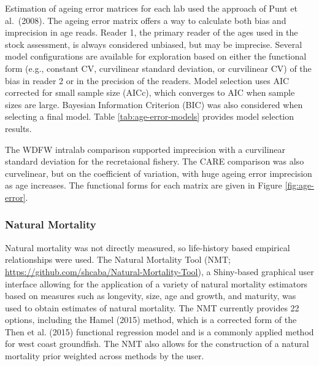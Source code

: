 \documentclass[11pt,
  english,
  a4paper,
]{article}
\begin{document}
\leavevmode\tagmcend\tagstructend\par


Estimation of ageing error matrices for each lab used the approach of Punt et al.~(2008). The ageing error matrix offers a way to calculate both bias and imprecision in age reads. Reader 1, the primary reader of the ages used in the stock assessment, is always considered unbiased, but may be imprecise. Several model configurations are available for exploration based on either the functional form (e.g., constant CV, curvilinear standard deviation, or curvilinear CV) of the bias in reader 2 or in the precision of the readers. Model selection uses AIC corrected for small sample size (AICc), which converges to AIC when sample sizes are large. Bayesian Information Criterion (BIC) was also considered when selecting a final model. Table \ref{tab:age-error-models} provides model selection results.

\leavevmode\tagmcend\tagstructend\par


The WDFW intralab comparison supported imprecision with a curvilinear standard deviation for the recretaional fishery. The CARE comparison was also curvelinear, but on the coefficient of variation, with huge ageing error imprecision as age increases. The functional forms for each matrix are given in Figure \ref{fig:age-error}.

\leavevmode\tagmcend\tagstructend\par


\hypertarget{natural-mortality}{%
\subsubsection{Natural Mortality}\label{natural-mortality}}

\leavevmode\tagmcend\tagstructend


Natural mortality was not directly measured, so life-history based empirical relationships were used. The Natural Mortality Tool (NMT; {\url{https://github.com/shcaba/Natural-Mortality-Tool}\leavevmode\tagmcend\tagstructend}), a Shiny-based graphical user interface allowing for the application of a variety of natural mortality estimators based on measures such as longevity, size, age and growth, and maturity, was used to obtain estimates of natural mortality. The NMT currently provides 22 options, including the Hamel {(2015)\leavevmode\tagmcend\tagstructend} method, which is a corrected form of the Then et al. {(2015)\leavevmode\tagmcend\tagstructend} functional regression model and is a commonly applied method for west coast groundfish. The NMT also allows for the construction of a natural mortality prior weighted across methods by the user.
\end{document}
